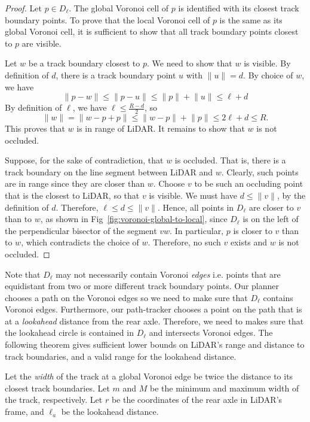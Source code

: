 \begin{proof}
Let $p \in D_\ell$.
%
The global Voronoi cell of $p$ is identified with its closest track boundary points.
%
To prove that the local Voronoi cell of $p$ is the same as its global Voronoi cell, it is sufficient to show that all track boundary points closest to $p$ are visible.


Let $w$ be a track boundary closest to $p$.
%
We need to show that $w$ is visible.
%
By definition of $d$, there is a track boundary point $u$ with $\lVert u \rVert = d$.
%
By choice of $w$, we have
$$
\lVert p - w \rVert 
\leq \lVert p - u \rVert 
\leq \lVert p \rVert + \lVert u \rVert \leq \ell + d
$$
%
By definition of $\ell$, we have $\ell \leq \frac{R-d}{2}$, so
$$
\lVert w \rVert = \lVert w - p + p \rVert \leq \lVert w-p \rVert + \lVert p \rVert \leq 2\ell+d \leq R.
$$
%
This proves that $w$ is in range of LiDAR.
%
It remains to show that $w$ is not occluded.

Suppose, for the sake of contradiction, that $w$ is occluded.
%
That is,
there is a track boundary on the line segment between LiDAR and $w$.
%
Clearly, such points are in range since they are closer than $w$.
%
Choose $v$ to be such an occluding point that is the closest to LiDAR, so that $v$ is visible.
%
We must have $d \leq \lVert v \rVert $, by the definition of $d$.
%
Therefore, $\ell \leq d \leq \lVert v \rVert $.
%
Hence, all points in $D_\ell$ are closer to $v$ than to $w$, as shown in Fig~\ref{fig:voronoi-global-to-local}, since $D_\ell$ is on the left of the perpendicular bisector of the segment $vw$. 
%
In particular, $p$ is closer to $v$ than to $w$, which contradicts the choice of $w$.
%
Therefore, no such $v$ exists and $w$ is not occluded.
\end{proof}

Note that $D_\ell$ may not necessarily contain Voronoi \emph{edges} i.e. points that are equidistant from two or more different track boundary points.
%
Our planner chooses a path on the Voronoi edges so we need to make sure that $D_\ell$ contains Voronoi edges.
%
Furthermore, our path-tracker chooses a point on the path that is at a \emph{lookahead} distance from the rear axle.
%
Therefore, we need to makes sure that the lookahead circle is contained in $D_\ell$ and intersects Voronoi edges.
%
The following theorem gives sufficient lower bounds on LiDAR's range and distance to track boundaries, and a valid range for the lookahead distance.


Let the \emph{width} of the track at a global Voronoi edge be twice the distance to its closest track boundaries.
%
Let $m$ and $M$ be the minimum and maximum width of the track, respectively.
%
Let $r$ be the coordinates of the rear axle in LiDAR's frame, and $\ell_a$ be the lookahead distance.


